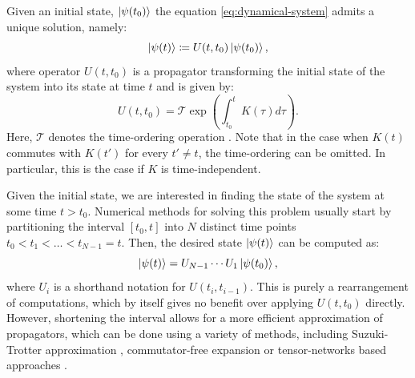 Given an initial state, $\ket{\psi(t_0)}$ the equation
\eqref{eq:dynamical-system} admits a unique solution, namely:
\begin{equation}
  \ket{\psi(t)} \coloneqq U(t, t_0) \ket{\psi(t_0)},
\end{equation}
where operator $U(t, t_0)$ is a propagator transforming the initial state of
the system into its state at time $t$ and is given by:
\begin{equation}
  \label{eq:propagator}
  U(t, t_0) = \mathcal{T} \exp \left( \int_{t_0}^t K(\tau)d\tau \right).
\end{equation}
Here, $\mathcal{T}$ denotes the time-ordering operation \cite{chronological}.
Note that in the case when $K(t)$ commutes with $K(t')$ for every $t' \ne t$,
the time-ordering can be omitted. In particular, this is the case if $K$ is
time-independent.

Given the initial state, we are interested in finding the state of the system
at some time $t > t_0$. Numerical methods for solving this problem usually
start by partitioning the interval $[t_0, t]$ into $N$ distinct time points
$t_0 < t_1 < \ldots < t_{N-1} = t$. Then, the desired state $\ket{\psi(t)}$ can
be computed as:
%
\begin{equation}
  \ket{\psi(t)} = U_{N-1} \cdots U_1 \ket{\psi(t_0)},
\end{equation}
%
where $U_i$ is a shorthand notation for $U(t_i, t_{i-1})$. This is purely a
rearrangement of computations, which by itself gives no benefit over applying
$U(t, t_0)$ directly. However, shortening the interval allows for a more
efficient approximation of propagators, which can be done using a variety of
methods, including Suzuki-Trotter approximation \cite{suzuki}, commutator-free
expansion \cite{commutatorfree} or tensor-networks based approaches
\cite{dmrg}.

